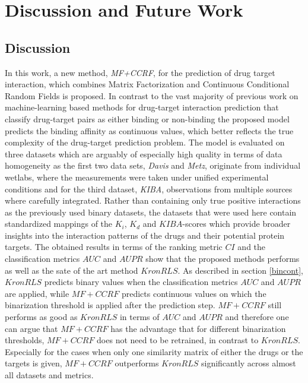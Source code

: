 \chapter{Discussion and Future Work}

\section{Discussion}

In this work, a new method, \textit{MF+CCRF}, for the prediction of drug target interaction, which combines Matrix Factorization and Continuous Conditional Random Fields is proposed. In contrast to the vast majority of previous work on machine-learning based methods for drug-target interaction prediction that classify drug-target pairs as either binding or non-binding the proposed model predicts the binding affinity as continuous values, which better reflects the true complexity of the drug-target prediction problem. The model is evaluated on three datasets which are arguably of especially high quality in terms of data homogeneity as the first two data sets, \textit{Davis} and \textit{Metz}, originate from individual wetlabs, where the measurements were taken under unified experimental conditions and for the third dataset, \textit{KIBA}, observations from multiple sources where carefully integrated. Rather than containing only true positive interactions as the previously used binary datasets, the datasets that were used here
contain standardized mappings of the $K_i$, $K_d$ and $KIBA$-scores which provide broader insights into the interaction patterns of the drugs and their potential protein targets. The obtained results in terms of the ranking metric $CI$ and the classification metrics $AUC$ and $AUPR$ show that the proposed methods performs as well as the sate of the art method $KronRLS$. As described in section \ref{bincont}, $KronRLS$ predicts binary values when the classification metrics $AUC$ and $AUPR$ are applied, while $MF+CCRF$ predicts continuous values on which the binarization threshold is applied after the prediction step. $MF+CCRF$ still performs as good as $KronRLS$ in terms of $AUC$ and $AUPR$ and therefore one can argue that $MF+CCRF$ has the advantage that for different binarization thresholds, $MF+CCRF$ does not need to be retrained, in contrast to $KronRLS$. Especially for the cases when only one similarity matrix of either the drugs or the targets is given, $MF+CCRF$ outperforms $KronRLS$ significantly across almost all datasets and metrics. 

